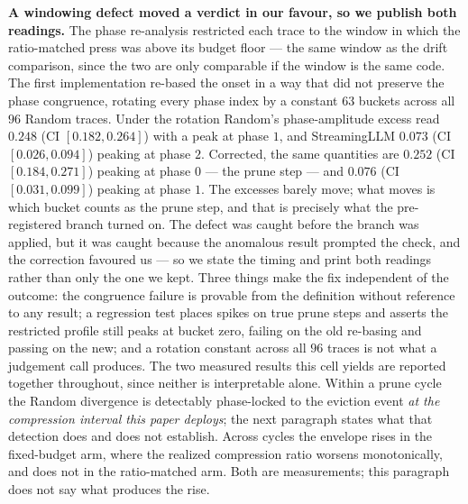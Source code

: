 \documentclass{article}
\begin{document}
\textbf{A windowing defect moved a verdict in our favour, so we publish both
readings.} The phase re-analysis restricted each trace to the window in which
the ratio-matched press was above its budget floor --- the same window as the
drift comparison, since the two are only comparable if the window is the same
code. The first implementation re-based the onset in a way that did not preserve
the phase congruence, rotating every phase index by a constant $63$ buckets
across all $96$ Random traces. Under the rotation Random's phase-amplitude
excess read $0.248$ (CI $[0.182, 0.264]$) with a peak at phase $1$, and
StreamingLLM $0.073$ (CI $[0.026, 0.094]$) peaking at phase $2$. Corrected, the
same quantities are $0.252$ (CI $[0.184, 0.271]$) peaking at phase $0$ --- the
prune step --- and $0.076$ (CI $[0.031, 0.099]$) peaking at phase $1$. The
excesses barely move; what moves is which bucket counts as the prune step, and
that is precisely what the pre-registered branch turned on. The defect was
caught before the branch was applied, but it was caught because the anomalous
result prompted the check, and the correction favoured us --- so we state the
timing and print both readings rather than only the one we kept. Three things
make the fix independent of the outcome: the congruence failure is provable from
the definition without reference to any result; a regression test places spikes
on true prune steps and asserts the restricted profile still peaks at bucket
zero, failing on the old re-basing and passing on the new; and a rotation
constant across all $96$ traces is not what a judgement call produces. The two
measured results this cell yields are reported together throughout, since
neither is interpretable alone. Within a prune cycle the Random divergence is
detectably phase-locked to the eviction event \emph{at the compression interval
this paper deploys}; the next paragraph states what that detection does and does
not establish. Across
cycles the envelope rises in the fixed-budget arm, where the realized
compression ratio worsens monotonically, and does not in the ratio-matched arm.
Both are measurements; this paragraph does not say what produces the rise.
\end{document}
